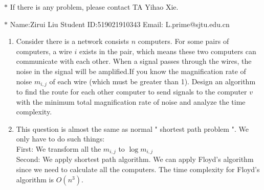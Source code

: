 \documentclass[12pt,a4paper]{article}
\makeatletter
\newtheorem*{solution}{Solution}
\theoremstyle{definition}
\renewenvironment{solution}[1][Solution] {\par\pushQED{\qed}\normalfont\topsep6\p@\@plus6\p@\relax\trivlist\item[\hskip\labelsep\bfseries#1\@addpunct{.}]\ignorespaces}{\popQED\endtrivlist\@endpefalse} \makeatother
\makeatother
\begin{document}
\noindent

\noindent{}
\begin{center}
\footnotesize{\color{red}$*$ If there is any problem, please contact TA Yihao Xie. }

\footnotesize{\color{blue}$*$ Name:Zirui Liu  \quad Student ID:519021910343 \quad Email: L.prime@sjtu.edu.cn}
\end{center}

\begin{enumerate}
    \item  Consider there is a network consists $n$ computers. For some pairs of computers, a wire $i$ exists in the pair, which means these two computers can communicate with each other. When a signal passes through the wires, the noise in the signal will be amplified.If you know the magnification rate of noise $m_{i,j}$ of each wire (which must be greater than 1). Design an algorithm to find the route  for each other computer to send signals to the computer $v$ with the minimum total magnification rate of noise and analyze the time complexity.
	
	\begin{solution}
	This question is almost the same as normal " shortest path problem ". We only have to do such things: \\
	First: We transform all the $m_{i,j}$ to $\log m_{i,j}$ \\
	Second: We apply shortest path algorithm. We can apply Floyd's algorithm since we need to calculate all the computers. The time complexity for Floyd's algorithm is $O\left(n^3\right)$. 
	
	\end{solution}
	
	
	

\end{enumerate}
\end{document}
